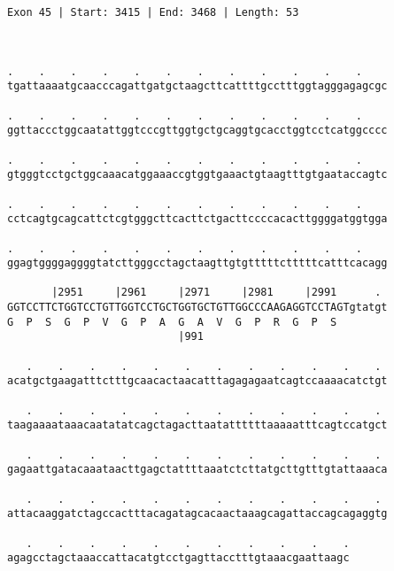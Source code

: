 \documentclass{article}
\begin{document}
\begin{Verbatim}
Exon 45 | Start: 3415 | End: 3468 | Length: 53



.    .    .    .    .    .    .    .    .    .    .    .    
tgattaaaatgcaacccagattgatgctaagcttcattttgcctttggtagggagagcgc
                                                            
.    .    .    .    .    .    .    .    .    .    .    .    
ggttaccctggcaatattggtcccgttggtgctgcaggtgcacctggtcctcatggcccc
                                                            
.    .    .    .    .    .    .    .    .    .    .    .    
gtgggtcctgctggcaaacatggaaaccgtggtgaaactgtaagtttgtgaataccagtc
                                                            
.    .    .    .    .    .    .    .    .    .    .    .    
cctcagtgcagcattctcgtgggcttcacttctgacttccccacacttggggatggtgga
                                                            
.    .    .    .    .    .    .    .    .    .    .    .    
ggagtggggaggggtatcttgggcctagctaagttgtgtttttctttttcatttcacagg
                                                            
       |2951     |2961     |2971     |2981     |2991      . 
GGTCCTTCTGGTCCTGTTGGTCCTGCTGGTGCTGTTGGCCCAAGAGGTCCTAGTgtatgt
G  P  S  G  P  V  G  P  A  G  A  V  G  P  R  G  P  S        
                           |991                             
  
   .    .    .    .    .    .    .    .    .    .    .    . 
acatgctgaagatttctttgcaacactaacatttagagagaatcagtccaaaacatctgt
                                                            
   .    .    .    .    .    .    .    .    .    .    .    . 
taagaaaataaacaatatatcagctagacttaatattttttaaaaatttcagtccatgct
                                                            
   .    .    .    .    .    .    .    .    .    .    .    . 
gagaattgatacaaataacttgagctattttaaatctcttatgcttgtttgtattaaaca
                                                            
   .    .    .    .    .    .    .    .    .    .    .    . 
attacaaggatctagccactttacagatagcacaactaaagcagattaccagcagaggtg
                                                            
   .    .    .    .    .    .    .    .    .    .    .
agagcctagctaaaccattacatgtcctgagttacctttgtaaacgaattaagc
                                                      

\end{Verbatim}
\end{document}
